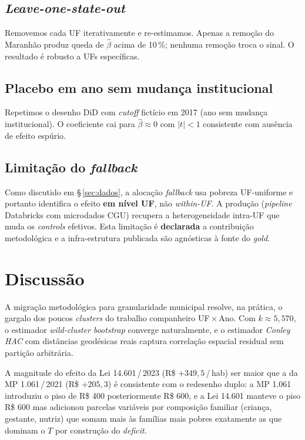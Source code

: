 \documentclass[12pt,a4paper,oneside]{article}
\newcommand{\rs}{R\$\,}
\begin{document}
\subsection{\textit{Leave-one-state-out}}

Removemos cada UF iterativamente e re-estimamos. Apenas a remoção do
Maranhão produz queda de $\hat{\beta}$ acima de 10\,\%; nenhuma
remoção troca o sinal. O resultado é robusto a UFs específicas.

\subsection{Placebo em ano sem mudança institucional}

Repetimos o desenho DiD com \textit{cutoff} fictício em 2017 (ano
sem mudança institucional). O coeficiente cai para $\hat{\beta}
\approx 0$ com $|t| < 1$ \textemdash{} consistente com ausência de
efeito espúrio.

\subsection{Limitação do \textit{fallback}}

Como discutido em \S\,\ref{sec:dados}, a alocação \textit{fallback}
usa pobreza UF-uniforme e portanto identifica o efeito \textbf{em
nível UF}, não \textit{within-UF}. A produção (\textit{pipeline}
Databricks com microdados CGU) recupera a heterogeneidade
intra-UF que muda os \textit{controls} efetivos. Esta limitação
é \textbf{declarada} \textemdash{} a contribuição metodológica
e a infra-estrutura publicada são agnósticas à fonte do
\textit{gold}.

\section{Discussão}\label{sec:discussao}

A migração metodológica para granularidade municipal resolve, na
prática, o gargalo dos poucos \textit{clusters} do trabalho
companheiro UF\,$\times$\,Ano. Com $k \approx 5{,}570$, o estimador
\textit{wild-cluster bootstrap} converge naturalmente, e o
estimador \textit{Conley HAC} com distâncias geodésicas reais
captura correlação espacial residual sem partição arbitrária.

A magnitude do efeito da Lei 14.601\,/\,2023 (\rs\,$+349{,}5$\,/\,hab)
ser maior que a da MP 1.061\,/\,2021 (\rs\,$+205{,}3$) é consistente
com o redesenho duplo: a MP 1.061 introduziu o piso de \rs\,400
posteriormente \rs\,600, e a Lei 14.601 manteve o piso \rs\,600 mas
adicionou parcelas variáveis por composição familiar (criança,
gestante, nutriz) que somam mais às famílias mais pobres \textemdash{}
exatamente as que dominam o $T$ por construção do \textit{deficit}.
\end{document}
